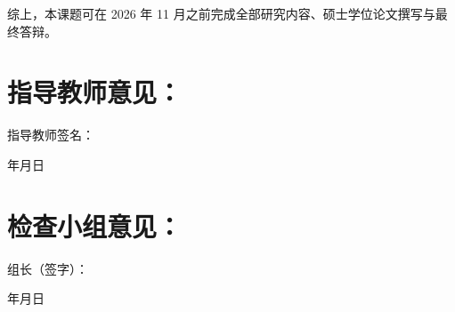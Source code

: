 综上，本课题可在 2026 年 11 月之前完成全部研究内容、硕士学位论文撰写与最终答辩。

\section*{指导教师意见：}

\vspace{60bp}

\vspace{24bp}
\hfill 指导教师签名：\hspace{8\ccwd}

\vspace{24bp}
\hfill 年\hspace{2\ccwd}月\hspace{2\ccwd}日

\section*{检查小组意见：}

\vspace{60bp}

\vspace{24bp}
\hfill 组长（签字）：\hspace{8\ccwd}

\vspace{24bp}
\hfill 年\hspace{2\ccwd}月\hspace{2\ccwd}日




